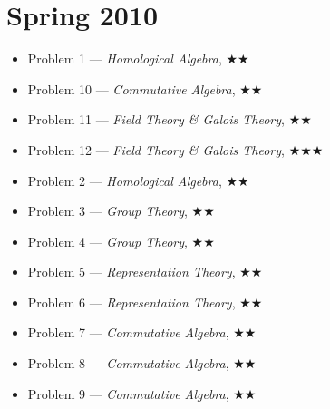 \documentclass[11pt,letterpaper]{book}
\begin{document}
\section*{Spring 2010}
\begin{itemize}
\item Problem 1 --- \textit{Homological Algebra}, $\bigstar\bigstar$
\item Problem 10 --- \textit{Commutative Algebra}, $\bigstar\bigstar$
\item Problem 11 --- \textit{Field Theory \& Galois Theory}, $\bigstar\bigstar$
\item Problem 12 --- \textit{Field Theory \& Galois Theory}, $\bigstar\bigstar\bigstar$
\item Problem 2 --- \textit{Homological Algebra}, $\bigstar\bigstar$
\item Problem 3 --- \textit{Group Theory}, $\bigstar\bigstar$
\item Problem 4 --- \textit{Group Theory}, $\bigstar\bigstar$
\item Problem 5 --- \textit{Representation Theory}, $\bigstar\bigstar$
\item Problem 6 --- \textit{Representation Theory}, $\bigstar\bigstar$
\item Problem 7 --- \textit{Commutative Algebra}, $\bigstar\bigstar$
\item Problem 8 --- \textit{Commutative Algebra}, $\bigstar\bigstar$
\item Problem 9 --- \textit{Commutative Algebra}, $\bigstar\bigstar$
\end{itemize}
\end{document}
